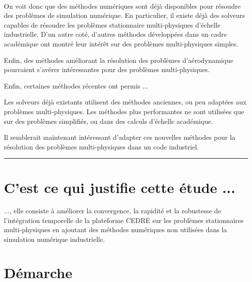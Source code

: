     \paragraph{}
    On voit donc que des méthodes numériques sont déjà disponibles pour résoudre des problèmes de simulation numérique.
    En particulier, il existe déjà des solveurs capables de résoudre les problèmes stationnaire multi-physiques d'échelle industrielle.
    D'un autre coté, d'autres méthodes développées dans un cadre académique ont montré leur intérêt sur des problèmes multi-physiques simples.

    Enfin, des méthodes améliorant la résolution des problèmes d'aérodynamique pourraient s'avérer intéressantes pour des problèmes multi-physiques.

    Enfin, certaines méthodes récentes ont permis ...

    Les solveurs déjà existants utilisent des méthodes anciennes, ou peu adaptées aux problèmes multi-physiques.
    Les méthodes plus performantes ne sont utilisées que sur des problèmes simplifiés, ou dans des calculs d'échelle académique.

    Il semblerait maintenant intéressant d'adapter ces nouvelles méthodes pour la résolution des problèmes multi-physiques dans un code industriel.

    \vspace{1cm}\hrule\vspace{1cm}

  \section*{C'est ce qui justifie cette étude ...}

    \paragraph{}
    ..., elle consiste à améliorer la convergence, la rapidité et la robustesse de l'intégration temporelle de la plateforme CEDRE sur les problèmes stationnaires multi-physiques en ajoutant des méthodes numériques non utilisées dans la simulation numérique industrielle.


  \section*{Démarche}

